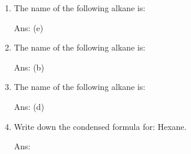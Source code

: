 \documentclass[main.tex]{subfiles}
\begin{document}
\begin{multicols*}{2}
\begin{enumerate}
\item The name of the following alkane is:  
\vspace{0.3cm}\begin{enumerate}[label=(\alph*)]
 \begin{flushright}\small Ans: (e) \end{flushright}
\end{enumerate}

\item The name of the following alkane is:  
\vspace{0.3cm}\begin{enumerate}[label=(\alph*)]
 \begin{flushright}\small Ans: (b) \end{flushright}
\end{enumerate}

\item The name of the following alkane is:  
\vspace{0.3cm}\begin{enumerate}[label=(\alph*)]
 \begin{flushright}\small Ans: (d) \end{flushright}
\end{enumerate}


\item Write down the condensed formula for: Hexane.
\begin{flushright}\small Ans: \small{} \end{flushright}


\end{enumerate}
\end{multicols*}
\end{document}
